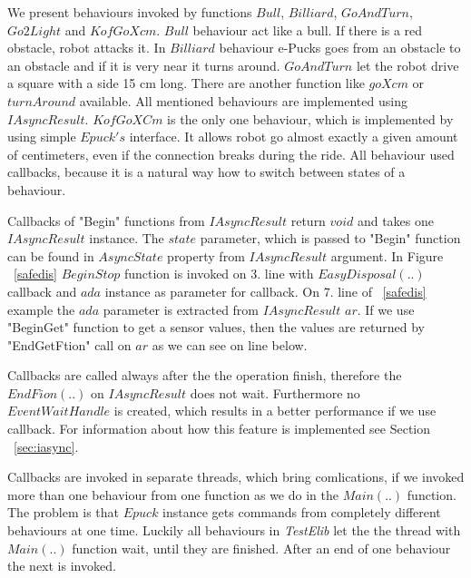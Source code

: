 	We present behaviours invoked by functions $Bull$, $Billiard$, $GoAndTurn$,$Go2Light$ and $KofGoXcm$.
	$Bull$ behaviour act like a bull. If there is a red obstacle, robot attacks it. 
	In $Billiard$ behaviour e-Pucks goes from an obstacle to an obstacle
	and if it is very near it turns around.
	$GoAndTurn$ let the robot drive a square with a side 15 cm long. 
	There are another function like $goXcm$ or $turnAround$ available.
	All mentioned behaviours are implemented using $IAsyncResult$. 
	$KofGoXCm$ is the only one behaviour, which is implemented by using simple $Epuck's$ interface.
	It allows robot go almost exactly a given amount of centimeters, even if the connection breaks during the ride.
	All behaviour used  callbacks, because it is a natural way how to switch between states of a behaviour.

	Callbacks of "Begin" functions from $IAsyncResult$ return $void$ and takes one $IAsyncResult$ instance.
	The $state$ parameter, which is passed to "Begin" function can be found in $AsyncState$ property from $IAsyncResult$ argument.
	In Figure ~\ref{safedis} $BeginStop$ function is invoked on 3. line with $EasyDisposal(..)$ callback 
	and $ada$ instance as parameter for callback.
	On 7. line of ~\ref{safedis} example the $ada$ parameter is extracted from $IAsyncResult$ $ar$.
	If we use "BeginGet" function to get a sensor values, then the values are returned by "EndGetFtion" call on $ar$ as we can see
	on line below.

	Callbacks are called always after the the operation finish, therefore the $EndFion(..)$ on $IAsyncResult$ does not wait.
	Furthermore no $EventWaitHandle$ is created, which results in a better performance if we use callback.
	For information about how this feature is implemented see Section ~\ref{sec:iasync}.

	Callbacks are invoked in separate threads, which bring comlications, if we invoked more than one behaviour
	from one function as we do in the $Main(..)$ function. The problem is that $Epuck$ instance gets 
	commands from completely different behaviours at one time.
	Luckily all behaviours in {\it TestElib} let the the thread with $Main(..)$ function wait, until they are finished.
	After an end of one behaviour the next is invoked.

